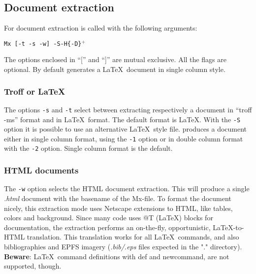 \documentclass{article}
\begin{document}

\subsection{Document extraction}

For document extraction \Mx is called with the following arguments:

\noindent
\begin{center}
	{\tt Mx [-t -s -w] -S\file [-1 -2] -H\n  \{-D\macro\}$^+$\mxfile}
\end{center}

The options enclosed in ``['' and ``]'' are mutual exclusive. 
All the flags are optional. By default \Mx generates a \LaTeX\
document in single column style.

\subsubsection{Troff or \LaTeX}
The options {\tt -s} and {\tt -t} select between extracting 
respectively a document in ``troff -ms'' format and in \LaTeX\ format.
The default format is \LaTeX. With the {\tt -S\file} option
it is possible to use an alternative \LaTeX\ style file. 
\Mx produces a document either in single column format, using the
{\tt -1} option or in double column format with the {\tt -2} option.
Single column format is the default.

\subsubsection{HTML documents}
The {\tt -w} option selects the HTML document extraction. This will
produce a single {\em .html} document with the basename of the Mx-file. To
format the document nicely, this extraction mode uses Netscape extensions
to HTML, like tables, colors and background.  Since many code uses @T 
(\LaTeX) blocks for documentation, the extraction performs an on-the-fly,
opportunistic, \LaTeX-to-HTML translation. This translation
works for all \LaTeX\ commands, and also bibliographies and EPFS imagery
({\em .bib/.eps} files expected in the "." directory). {\bf Beware}:
\LaTeX\ command definitions with {\Lc def} and
{\Lc newcommand}, are not supported, though.
\end{document}
